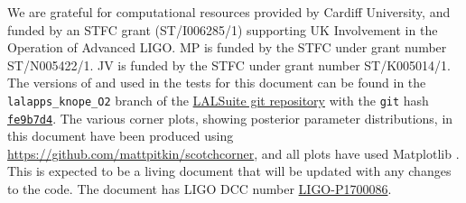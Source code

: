\acknowledgements

We are grateful for computational resources provided by Cardiff University, and funded by an STFC grant (ST/I006285/1) supporting UK Involvement in
the Operation of Advanced LIGO. MP is funded by the STFC under grant number ST/N005422/1. JV is funded by the STFC under grant number ST/K005014/1. The versions of \lppenf and \lppef used in the tests for this document
can be found in the {\tt lalapps\_knope\_O2} branch of the \href{https://github.com/lscsoft/lalsuite/tree/lalapps_knope_O2}{LALSuite git repository} with 
the {\tt git} hash \href{https://github.com/lscsoft/lalsuite/tree/fe9b7d4779cd7fbfbb57af946766601dfd270b23}{{\tt fe9b7d4}}. The various
corner plots, showing posterior parameter distributions, in this document have been produced using \url{https://github.com/mattpitkin/scotchcorner}, and all
plots have used Matplotlib \citet{Hunter:2007,michael_droettboom_2017_248351}.
This is expected
to be a living document that will be updated with any changes to the code. The document has LIGO DCC number \href{https://dcc.ligo.org/P1700086}{LIGO-P1700086}.
